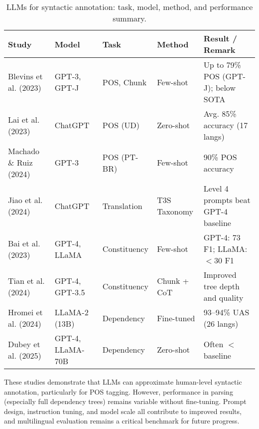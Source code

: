 \begin{table}[ht]
\centering
\begin{tabular}{p{3.3cm} p{2cm} p{2cm} p{2.5cm} p{3.5cm}}
\toprule
\textbf{Study} & \textbf{Model} & \textbf{Task} & \textbf{Method} & \textbf{Result / Remark} \\
\midrule
Blevins et al. (2023) & GPT-3, GPT-J & POS, Chunk & Few-shot & Up to 79\% POS (GPT-J); below SOTA \\
Lai et al. (2023) & ChatGPT & POS (UD) & Zero-shot & Avg. 85\% accuracy (17 langs) \\
Machado \& Ruiz (2024) & GPT-3 & POS (PT-BR) & Few-shot & 90\% POS accuracy \\
Jiao et al. (2024) & ChatGPT & Translation & T3S Taxonomy & Level 4 prompts beat GPT-4 baseline \\
Bai et al. (2023) & GPT-4, LLaMA & Constituency & Few-shot & GPT-4: 73 F1; LLaMA: $<$30 F1 \\
Tian et al. (2024) & GPT-4, GPT-3.5 & Constituency & Chunk + CoT & Improved tree depth and quality \\
Hromei et al. (2024) & LLaMA-2 (13B) & Dependency & Fine-tuned & 93--94\% UAS (26 langs) \\
Dubey et al. (2025) & GPT-4, LLaMA-70B & Dependency & Zero-shot & Often $<$ baseline \\
\bottomrule
\end{tabular}
\caption{LLMs for syntactic annotation: task, model, method, and performance summary.}
\label{tab:llm_syntax}
\end{table}

These studies demonstrate that LLMs can approximate human-level syntactic annotation, particularly for POS tagging. However, performance in parsing (especially full dependency trees) remains variable without fine-tuning. Prompt design, instruction tuning, and model scale all contribute to improved results, and multilingual evaluation remains a critical benchmark for future progress.


